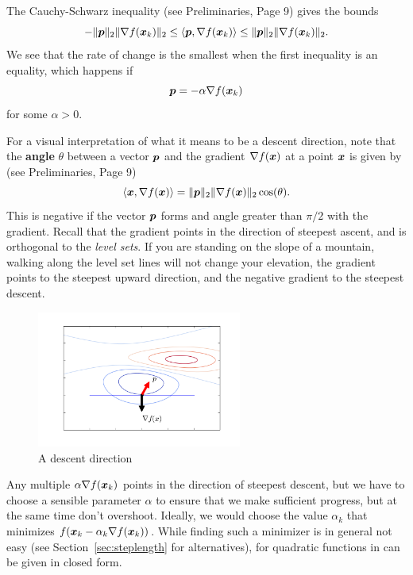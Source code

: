 The Cauchy-Schwarz inequality (see Preliminaries, Page 9) gives the bounds
\begin{equation*}
 -\Vert {\bm{p}}\Vert_2 \Vert {\nabla f(\bm{x}_k)}\Vert_2 \leq \langle {\bm{p}}, {\nabla f(\bm{x}_k)} \rangle \leq \Vert {\bm{p}}\Vert_2 \Vert {\nabla f(\bm{x}_k)}\Vert_2.
\end{equation*}
We see that the rate of change is the smallest when the first inequality is an equality, which happens if 
\begin{equation*}
 \bm{p} = -\alpha \nabla f(\bm{x}_k)
\end{equation*}
for some $\alpha>0$. 

For a visual interpretation of what it means to be a descent direction, note that the \textbf{angle} $\theta$ between a vector $\bm{p}$ and the gradient $\nabla f(\bm{x})$ at a point $\bm{x}$ is given by (see Preliminaries, Page 9)
\begin{equation*}
  \langle {\bm{x}}, {\nabla f(\bm{x})} \rangle = \Vert {\bm{p}}\Vert_2\Vert {\nabla f(\bm{x})}\Vert_2 \cos(\theta).
\end{equation*}
This is negative if the vector $\bm{p}$ forms and angle greater than $\pi/2$ with the gradient. Recall that the gradient points in the direction of steepest ascent, and is orthogonal to the {\em level sets}. If you are standing on the slope of a mountain, walking along the level set lines will not change your elevation, the gradient points to the steepest upward direction, and the negative gradient to the steepest descent.

\begin{figure}[h!]
\centering
\includegraphics[width=0.6\textwidth]{images/descent.png}
\caption{A descent direction}
\end{figure}

Any multiple $\alpha \nabla f(\bm{x}_k)$ points in the direction of steepest descent, but we have to choose a sensible parameter $\alpha$ to ensure that we make sufficient progress, but at the same time don't overshoot. Ideally, we would choose the value $\alpha_k$ that minimizes $f(\bm{x}_k-\alpha_k \nabla f(\bm{x}_k))$. While finding such a minimizer is in general not easy (see Section~\ref{sec:steplength} for alternatives), for quadratic functions in can be given in closed form.

